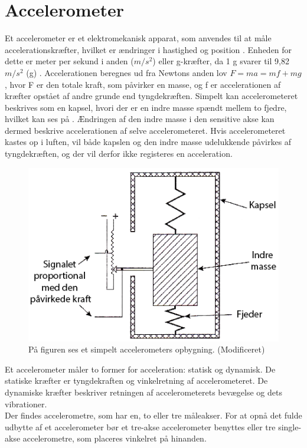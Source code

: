 \section{Accelerometer}
Et accelerometer er et elektromekanisk apparat, som anvendes til at måle accelerationskræfter, hvilket er ændringer i hastighed og position \citep{Goodrich2013,TittertonWeston2004}. Enheden for dette er meter per sekund i anden ($m/s^2$) eller g-kræfter, da 1 g svarer til 9,82$m/s^2$ (g) \citep{Sparkfun,TittertonWeston2004}.
Accelerationen beregnes ud fra Newtons anden lov $F=ma=mf+mg$, hvor F er den totale kraft, som påvirker en masse, og f er accelerationen af kræfter opstået af andre grunde end tyngdekræften.\citep{TittertonWeston2004} \newline
Simpelt kan accelerometeret beskrives som en kapsel, hvori der er en indre masse spændt mellem to fjedre, hvilket kan ses på . Ændringen af den indre masse i den sensitive akse kan dermed beskrive accelerationen af selve accelerometeret. Hvis accelerometeret kastes op i luften, vil både kapslen og den indre masse udelukkende påvirkes af tyngdekræften, og der vil derfor ikke registeres en acceleration.\citep{TittertonWeston2004} \newline

\begin{figure}[H]
	\centering
	\includegraphics[scale=0.35]{figures/bProblemloesning/accelerometer_basic.png}
	\caption{På figuren ses et simpelt accelerometers opbygning. \citep{TittertonWeston2004}(Modificeret)}
	\label{acc_simpelt}
\end{figure}

Et accelerometer måler to former for acceleration: statisk og dynamisk. De statiske kræfter er tyngdekraften og vinkelretning af accelerometeret. De dynamiske kræfter beskriver retningen af accelerometerets bevægelse og dets vibrationer. \citep{Sparkfun,Engineering, Goodrich2013} \\
Der findes accelerometre, som har en, to eller tre måleakser. For at opnå det fulde udbytte af et accelerometer bør et tre-akse accelerometer benyttes eller tre single-akse accelerometre, som placeres vinkelret på hinanden.\citep{TittertonWeston2004} 

